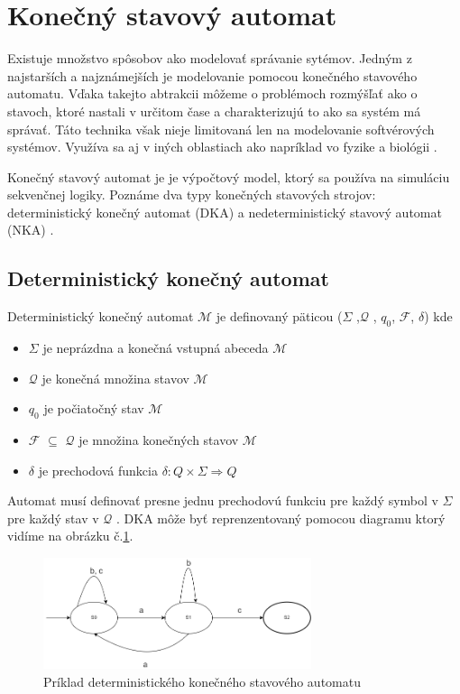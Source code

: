 \section{Konečný stavový automat}
\noindent Existuje množstvo spôsobov ako modelovať správanie sytémov. Jedným z 
najstarších a najznámejších je modelovanie pomocou konečného stavového automatu.
Vďaka takejto abtrakcii môžeme o problémoch rozmýšľať ako o stavoch, ktoré nastali v určitom čase a charakterizujú to ako sa systém má správať. Táto technika však nieje limitovaná len na modelovanie softvérových systémov. Využíva sa aj v iných oblastiach ako napríklad vo fyzike a biológii \cite{WaybackMachine2014}. \par 
Konečný stavový automat je je výpočtový model, ktorý sa používa na simuláciu sekvenčnej logiky. Poznáme dva typy konečných stavových strojov: deterministický konečný automat (DKA)  a nedeterministický stavový automat (NKA) \cite{FiniteStateMachines}. 

\subsection{Deterministický konečný automat}
\noindent Deterministický konečný automat $\mathcal{M}$ je definovaný päticou ($\Sigma$ ,$\mathcal{Q}$ , $q_0$, $\mathcal{F}$, $\delta$) kde
\begin{itemize}
    \item $\Sigma$ je neprázdna a konečná vstupná abeceda $\mathcal{M}$
    \item $\mathcal{Q}$ je konečná množina stavov $\mathcal{M}$
    \item $q_0$ je počiatočný stav $\mathcal{M}$
    \item $\mathcal{F}$ $\subseteq$ $\mathcal{Q}$ je množina konečných stavov $\mathcal{M}$
    \item $\delta$ je prechodová funkcia  \begin{math}\delta : Q \times \Sigma \Rightarrow Q\end{math}
\end{itemize}

Automat musí definovať presne jednu prechodovú funkciu pre každý symbol v $\Sigma$ pre každý stav v $\mathcal{Q}$ \cite{FiniteStateMachines}. DKA môže byť reprenzentovaný pomocou diagramu ktorý vidíme na obrázku č.\ref{figure:dfa1}.

\begin{figure}[h]
    \centering
    \includegraphics[width=0.70\textwidth]{img/dfa.png}
    \caption{Príklad deterministického konečného stavového automatu}
    \label{figure:dfa1}
\end{figure}

